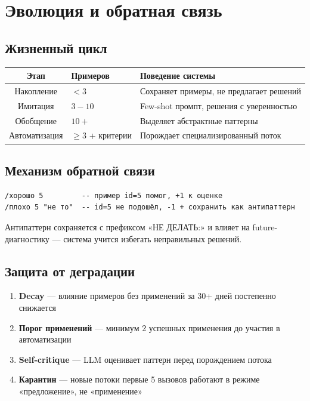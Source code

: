 \documentclass[12pt, a4paper, twoside]{article}
\begin{document}
\section{Эволюция и обратная связь}

\subsection{Жизненный цикл}

\begin{center}
\begin{tabular}{clp{6.5cm}}
  \toprule
  \textbf{Этап} & \textbf{Примеров} & \textbf{Поведение системы} \\
  \midrule
  Накопление    & $< 3$   & Сохраняет примеры, не предлагает решений \\
  Имитация      & $3-10$  & Few-shot промпт, решения с уверенностью \\
  Обобщение     & $10+$   & Выделяет абстрактные паттерны \\
  Автоматизация & $\geq3$ + критерии & Порождает специализированный поток \\
  \bottomrule
\end{tabular}
\end{center}

\subsection{Механизм обратной связи}

\begin{lstlisting}[language={},numbers=none]
/хорошо 5         -- пример id=5 помог, +1 к оценке
/плохо 5 "не то"  -- id=5 не подошёл, -1 + сохранить как антипаттерн
\end{lstlisting}

Антипаттерн сохраняется с префиксом «НЕ ДЕЛАТЬ:» и влияет на
future-диагностику --- система учится избегать неправильных решений.

\subsection{Защита от деградации}

\begin{enumerate}[leftmargin=1.5em]
  \item \textbf{Decay} --- влияние примеров без применений за 30+ дней постепенно снижается
  \item \textbf{Порог применений} --- минимум 2 успешных применения до участия в автоматизации
  \item \textbf{Self-critique} --- LLM оценивает паттерн перед порождением потока
  \item \textbf{Карантин} --- новые потоки первые 5 вызовов работают в режиме «предложение», не «применение»
\end{enumerate}
\end{document}
